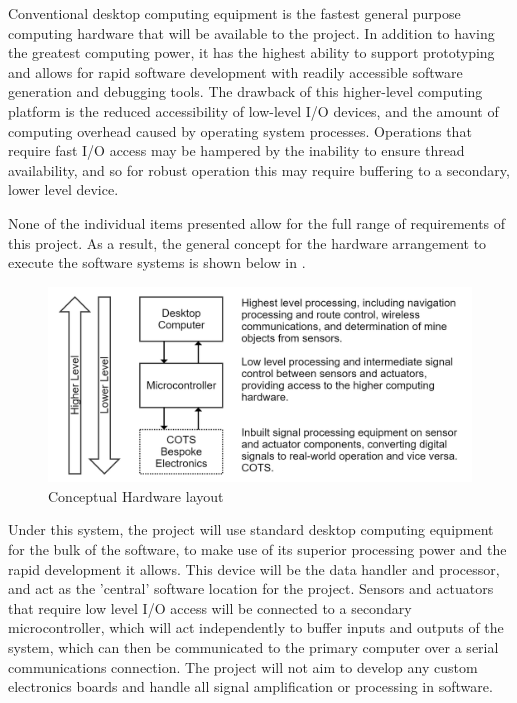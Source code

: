 \documentclass[main.tex]{subfiles}
\begin{document}
\begin{itemize}
Conventional desktop computing equipment is the fastest general purpose computing hardware that will be available to the project. In addition to having the greatest computing power, it has the highest ability to support prototyping and allows for rapid software development with readily accessible software generation and debugging tools. The drawback of this higher-level computing platform is the reduced accessibility of low-level I/O devices, and the amount of computing overhead caused by operating system processes. Operations that require fast I/O access may be hampered by the inability to ensure thread availability, and so for robust operation this may require buffering to a secondary, lower level device.
\end{itemize}

None of the individual items presented allow for the full range of requirements of this project. As a result, the general concept for the hardware arrangement to execute the software systems is shown below in .
\begin{figure}[ht]
\includegraphics[width = \textwidth]{4-ConceptDesign/electronics.png}
\centering
\caption{Conceptual Hardware layout} 
\end{figure}

Under this system, the project will use standard desktop computing equipment for the bulk of the software, to make use of its superior processing power and the rapid development it allows. This device will be the data handler and processor, and act as the 'central' software location for the project. Sensors and actuators that require low level I/O access will be connected to a secondary microcontroller, which will act independently to buffer inputs and outputs of the system, which can then be communicated to the primary computer over a serial communications connection. The project will not aim to develop any custom electronics boards and handle all signal amplification or processing in software.
\end{document}
